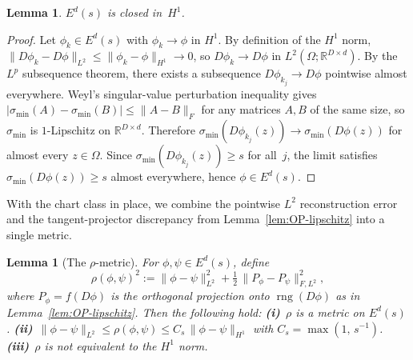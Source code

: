 \documentclass[11pt]{article}
\newcommand{\R}{\mathbb{R}}
\newcommand{\Om}{\Omega}
\newcommand{\rng}{\operatorname{rng}}
\newcommand{\norm}[1]{\lVert#1\rVert}
\newcommand{\sigmin}{\sigma_{\min}}
\newtheorem{lem}[thm]{Lemma}
\begin{document}
\begin{lem}\label{lem:Ed-closed}
  $E^d(s)$ is closed in~$H^1$.
\end{lem}

\begin{proof}
  Let $\phi_k\in E^d(s)$ with $\phi_k\to\phi$ in $H^1$.
  By definition of the $H^1$ norm,
  $\norm{D\phi_k-D\phi}_{L^2}\le\norm{\phi_k-\phi}_{H^1}\to 0$,
  so $D\phi_k\to D\phi$ in $L^2(\Om;\R^{D\times d})$.
  By the $L^p$ subsequence theorem, there exists a subsequence
  $D\phi_{k_j}\to D\phi$ pointwise almost everywhere.
  Weyl's singular-value perturbation inequality gives
  $|\sigmin(A)-\sigmin(B)|\le\norm{A-B}_F$ for any matrices
  $A,B$ of the same size, so $\sigmin$ is $1$-Lipschitz on
  $\R^{D\times d}$.
  Therefore
  $\sigmin(D\phi_{k_j}(z))\to\sigmin(D\phi(z))$
  for almost every $z\in\Om$.
  Since $\sigmin(D\phi_{k_j}(z))\ge s$ for all~$j$, the limit
  satisfies $\sigmin(D\phi(z))\ge s$ almost everywhere, hence
  $\phi\in E^d(s)$.
\end{proof}

With the chart class in place, we combine the pointwise $L^2$
reconstruction error and the tangent-projector discrepancy from
Lemma~\ref{lem:OP-lipschitz} into a single metric.

\begin{lem}[The $\rho$-metric]\label{lem:rho-metric}
  For $\phi,\psi\in E^d(s)$, define
  \[
    \rho(\phi,\psi)^2
    := \norm{\phi-\psi}_{L^2}^2
     + \tfrac{1}{2}\,\norm{P_\phi - P_\psi}_{F,L^2}^2,
  \]
  where $P_\phi = f(D\phi)$ is the orthogonal projection onto
  $\rng(D\phi)$ as in Lemma~\ref{lem:OP-lipschitz}.
  Then the following hold:
  \textup{\textbf{(i)}}~$\rho$ is a metric on $E^d(s)$.\quad
  \textup{\textbf{(ii)}}~$\norm{\phi-\psi}_{L^2} \le \rho(\phi,\psi) \le
    C_s\,\norm{\phi-\psi}_{H^1}$
    with $C_s = \max(1,\,s^{-1})$.\quad
  \textup{\textbf{(iii)}}~$\rho$ is not equivalent to the $H^1$ norm.
\end{lem}
\end{document}
